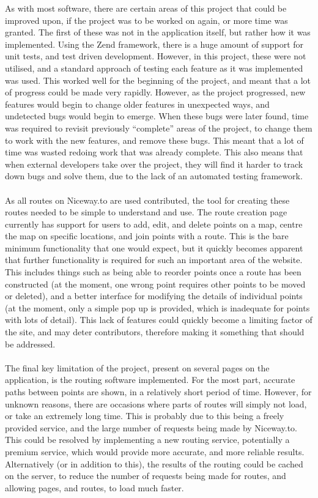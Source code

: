 \newpage 
\noindent 
As with most software, there are certain areas of this project that could be improved upon, if the project was to be worked on again, or more time was granted. The first of these was not in the application itself, but rather how it was implemented. Using the Zend framework, there is a huge amount of support for unit tests, and test driven development. However, in this project, these were not utilised, and a standard approach of testing each feature as it was implemented was used. This worked well for the beginning of the project, and meant that a lot of progress could be made very rapidly. However, as the project progressed, new features would begin to change older features in unexpected ways, and undetected bugs would begin to emerge. When these bugs were later found, time was required to revisit previously ``complete'' areas of the project, to change them to work with the new features, and remove these bugs. This meant that a lot of time was wasted redoing work that was already complete. This also means that when external developers take over the project, they will find it harder to track down bugs and solve them, due to the lack of an automated testing framework.\ \\
\ \\
As all routes on Niceway.to are used contributed, the tool for creating these routes needed to be simple to understand and use. The route creation page currently has support for users to add, edit, and delete points on a map, centre the map on specific locations, and join points with a route. This is the bare minimum functionality that one would expect, but it quickly becomes apparent that further functionality is required for such an important area of the website. This includes things such as being able to reorder points once a route has been constructed (at the moment, one wrong point requires other points to be moved or deleted), and a better interface for modifying the details of individual points (at the moment, only a simple pop up is provided, which is inadequate for points with lots of detail). This lack of features could quickly become a limiting factor of the site, and may deter contributors, therefore making it something that should be addressed.\ \\
\ \\
The final key limitation of the project, present on several pages on the application, is the routing software implemented. For the most part, accurate paths between points are shown, in a relatively short period of time. However, for unknown reasons, there are occasions where parts of routes will simply not load, or take an extremely long time. This is probably due to this being a freely provided service, and the large number of requests being made by Niceway.to. This could be resolved by implementing a new routing service, potentially a premium service, which would provide more accurate, and more reliable results. Alternatively (or in addition to this), the results of the routing could be cached on the server, to reduce the number of requests being made for routes, and allowing pages, and routes, to load much faster.


